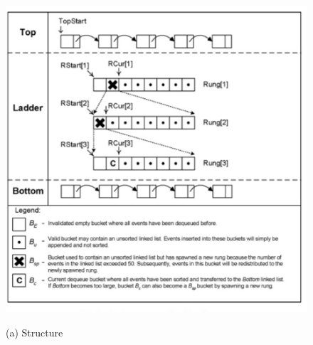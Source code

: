 \begin{figure} \centering
\begin{minipage}{0.49\linewidth}
\includegraphics[width=\linewidth]{images/LadderQueue1.png}
\centerline{(a) Structure} \\


\end{minipage}
\end{figure}
